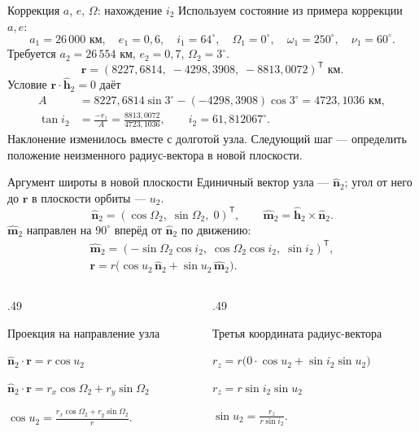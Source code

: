 \documentclass[11pt,aspectratio=169,t]{beamer}
\begin{document}
\begin{frame}{Коррекция $a$, $e$, $\Omega$: нахождение $i_2$}
Используем состояние из примера коррекции $a,e$:
\[
a_1=26\,000\text{ км},\quad e_1=0{,}6,\quad i_1=64^\circ,\quad
\Omega_1=0^\circ,\quad\omega_1=250^\circ,\quad\nu_1=60^\circ.
\]
Требуется $a_2=26\,554$ км, $e_2=0{,}7$, $\Omega_2=3^\circ$.
\[
\mathbf r=(8227{,}6814,\;-4298{,}3908,\;-8813{,}0072)^{\mathsf T}\text{ км}.
\]
Условие $\mathbf r\cdot\widehat{\mathbf h}_2=0$ даёт
\begin{align*}
A&=8227{,}6814\sin3^\circ-(-4298{,}3908)\cos3^\circ=4723{,}1036\text{ км},\\
\tan i_2&=\frac{-r_z}{A}=\frac{8813{,}0072}{4723{,}1036},
\qquad \boxed{i_2=61{,}812067^\circ.}
\end{align*}
\justifying
Наклонение изменилось вместе с долготой узла. Следующий шаг — определить
положение неизменного радиус-вектора в новой плоскости.
\end{frame}

\begin{frame}{Аргумент широты в новой плоскости}
\setlength{\abovedisplayskip}{2pt}
\setlength{\belowdisplayskip}{2pt}
\setlength{\jot}{0pt}
\justifying
Единичный вектор узла --- $\widehat{\mathbf n}_2$;
угол от него до $\mathbf r$ в плоскости орбиты --- $u_2$.
\[
\widehat{\mathbf n}_2=(\cos\Omega_2,\;\sin\Omega_2,\;0)^{\mathsf T},\qquad
\widehat{\mathbf m}_2=\widehat{\mathbf h}_2\times\widehat{\mathbf n}_2.
\]
$\widehat{\mathbf m}_2$ направлен на $90^\circ$ вперёд от $\widehat{\mathbf n}_2$ по движению:
\begin{gather*}
\widehat{\mathbf m}_2=(-\sin\Omega_2\cos i_2,\;\cos\Omega_2\cos i_2,\;\sin i_2)^{\mathsf T},\\
\mathbf r=r\bigl(\cos u_2\,\widehat{\mathbf n}_2+\sin u_2\,\widehat{\mathbf m}_2\bigr).
\end{gather*}
\begin{columns}[T,onlytextwidth]
\begin{column}{.49\textwidth}
{\color{courseaccent}Проекция на направление узла\par}
\smallskip\centering
$\widehat{\mathbf n}_2\cdot\mathbf r=r\cos u_2$\par\smallskip
$\widehat{\mathbf n}_2\cdot\mathbf r=r_x\cos\Omega_2+r_y\sin\Omega_2$\par\smallskip
$\displaystyle\boxed{\cos u_2=\frac{r_x\cos\Omega_2+r_y\sin\Omega_2}{r}.}$
\end{column}
\begin{column}{.49\textwidth}
{\color{courseaccent}Третья координата радиус-вектора\par}
\smallskip\centering
$r_z=r\bigl(0\cdot\cos u_2+\sin i_2\sin u_2\bigr)$\par\smallskip
$r_z=r\sin i_2\sin u_2$\par\smallskip
$\displaystyle\boxed{\sin u_2=\frac{r_z}{r\sin i_2}.}$
\end{column}
\end{columns}
\end{frame}
\end{document}
